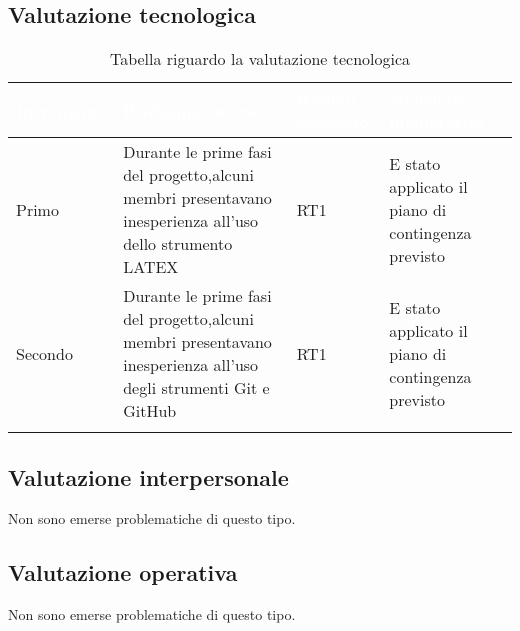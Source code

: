 \subsection{Valutazione tecnologica}
{
    \setlength{\freewidth}{\dimexpr\textwidth-10\tabcolsep}
    \renewcommand{\arraystretch}{1.5}
    \centering
    \setlength{\aboverulesep}{0pt}
    \setlength{\belowrulesep}{0pt}
    \begin{longtable}{C{.25\freewidth} C{.257\freewidth} C{.16\freewidth} C{.4\freewidth}}
       \toprule
    \textcolor{white}{\textbf{Incremento}}&
    \textcolor{white}{\textbf{Problema emerso}}&
    \textcolor{white}{\textbf{Rischio associato}}&
    \textcolor{white}{\textbf{Soluzione migliorativa}}\\	
    \toprule
    \endhead
    
Primo & Durante le prime fasi del progetto,alcuni membri presentavano inesperienza all'uso dello strumento LATEX & RT1 & E stato applicato il piano di contingenza
previsto \\
Secondo & Durante le prime fasi del progetto,alcuni membri presentavano inesperienza all'uso degli strumenti Git e GitHub & RT1 & E stato applicato il piano di contingenza
previsto\\

 \bottomrule
 \caption{Tabella riguardo la valutazione tecnologica}
\end{longtable}
}

\subsection{Valutazione interpersonale}
Non sono emerse problematiche di questo tipo. 

\subsection{Valutazione operativa}
Non sono emerse problematiche di questo tipo.
